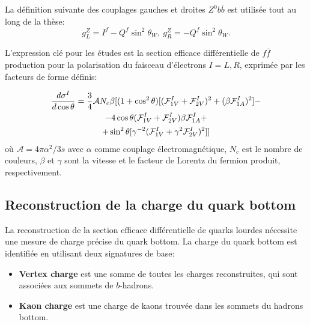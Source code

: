 La définition suivante des couplages gauches et droites $Z^0b\bar{b}$ est utilisée tout au long de la thèse: 
\begin{equation}
g_L^Z = I^f - Q^f\sin^2\theta_W, \  g_R^Z = -Q^f\sin^2\theta_W.
\label{formula:EWcouplings_3F}
\end{equation}

L'expression clé pour les études est la section efficace différentielle de $f\bar{f}$ production pour la polarisation du faisceau d'électrons $I=L,R$, exprimée par les facteurs de forme définis:

\begin{multline}
\label{formula:DiffSigma_3F}
\frac{d\sigma^I}{d\cos\theta} = \frac{3}{4} \mathcal{A} N_c \beta[ (1+\cos^2\theta) [(\mathcal{F}^I_{1V}+\mathcal{F}^I_{2V})^2+(\beta \mathcal{F}^I_{1A})^2] - \\-4 \cos\theta (\mathcal{F}^I_{1V}+\mathcal{F}^I_{2V})\beta \mathcal{F}^I_{1A} +\\+ \sin^2\theta [\gamma ^{-2} (\mathcal{F}^I_{1V} +\gamma^2 \mathcal{F}^I_{2V})^2] ]
\end{multline}
où $\mathcal{A} = 4\pi\alpha^2/3s$ avec $\alpha$ comme couplage électromagnétique, $N_c$ est le nombre de couleurs, $\beta$ et $\gamma$ sont la vitesse et le facteur de Lorentz du fermion produit, respectivement.

\newpage
\subsection*{Reconstruction de la charge du quark bottom}
La reconstruction de la section efficace différentielle de quarks lourdes nécessite une mesure de charge précise du quark bottom.
La charge du quark bottom est identifiée en utilisant deux signatures de base:
\begin{itemize}
	\item \textbf{Vertex charge} est une somme de toutes les charges reconstruites, qui sont associées aux sommets de $b$-hadrons.
	\item \textbf{Kaon charge} est une charge de kaons trouvée dans les sommets du hadrons bottom.
\end{itemize}


